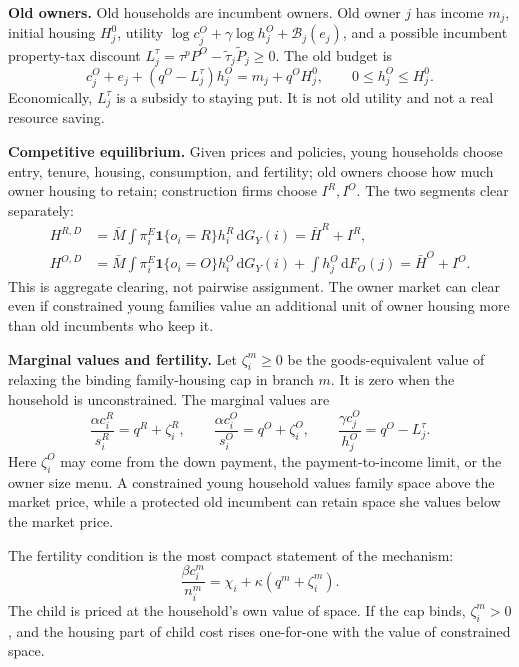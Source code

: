 \documentclass[10pt]{article}
\newcommand{\dd}{\mathrm d}
\newcommand{\1}{\mathbf 1}
\begin{document}
\textbf{Old owners.}
Old households are incumbent owners. Old owner \(j\) has income \(m_j\), initial housing \(H_j^0\), utility \(\log c_j^O+\gamma\log h_j^O+\mathcal B_j(e_j)\), and a possible incumbent property-tax discount \(L_j^\tau=\tau^pP^O-\tilde\tau_j\tilde P_j\ge0\). The old budget is
\[
c_j^O+e_j+(q^O-L_j^\tau)h_j^O=m_j+q^O H_j^0,\qquad 0\le h_j^O\le H_j^0 .
\]
Economically, \(L_j^\tau\) is a subsidy to staying put. It is not old utility and not a real resource saving.

\textbf{Competitive equilibrium.}
Given prices and policies, young households choose entry, tenure, housing, consumption, and fertility; old owners choose how much owner housing to retain; construction firms choose \(I^R,I^O\). The two segments clear separately:
\[
\begin{aligned}
H^{R,D}&=\bar M\int \pi_i^E\1\{o_i=R\}h_i^R\,\dd G_Y(i)=\bar H^R+I^R,\\
H^{O,D}&=\bar M\int \pi_i^E\1\{o_i=O\}h_i^O\,\dd G_Y(i)+\int h_j^O\,\dd F_O(j)=\bar H^O+I^O .
\end{aligned}
\]
This is aggregate clearing, not pairwise assignment. The owner market can clear even if constrained young families value an additional unit of owner housing more than old incumbents who keep it.

\textbf{Marginal values and fertility.}
Let \(\zeta_i^m\ge0\) be the goods-equivalent value of relaxing the binding family-housing cap in branch \(m\). It is zero when the household is unconstrained. The marginal values are
\[
\frac{\alpha c_i^R}{s_i^R}=q^R+\zeta_i^R,\qquad
\frac{\alpha c_i^O}{s_i^O}=q^O+\zeta_i^O,\qquad
\frac{\gamma c_j^O}{h_j^O}=q^O-L_j^\tau .
\]
Here \(\zeta_i^O\) may come from the down payment, the payment-to-income limit, or the owner size menu. A constrained young household values family space above the market price, while a protected old incumbent can retain space she values below the market price.

The fertility condition is the most compact statement of the mechanism:
\[
\frac{\beta c_i^m}{n_i^m}
=
\chi_i+\kappa(q^m+\zeta_i^m).
\]
The child is priced at the household's own value of space. If the cap binds, \(\zeta_i^m>0\), and the housing part of child cost rises one-for-one with the value of constrained space.
\end{document}
